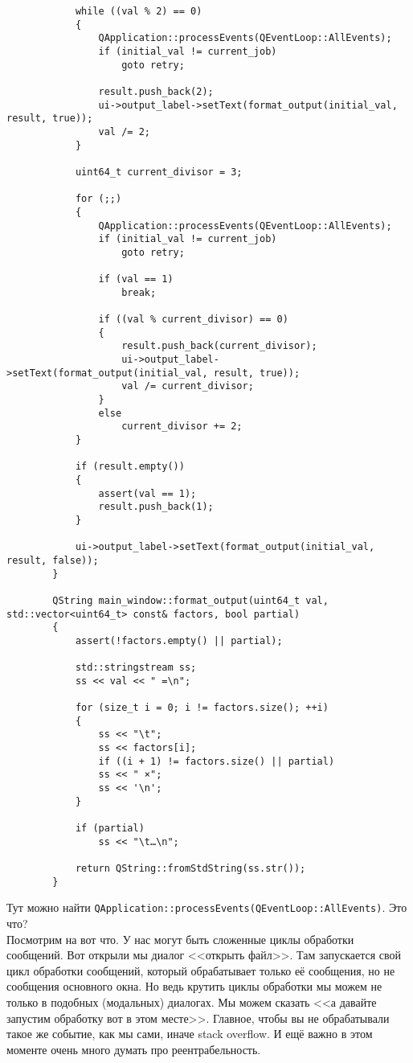 \documentclass{article}
\begin{document}
\begin{verbatim}
            while ((val % 2) == 0)
            {
                QApplication::processEvents(QEventLoop::AllEvents);
                if (initial_val != current_job)
                    goto retry;
                
                result.push_back(2);
                ui->output_label->setText(format_output(initial_val, result, true));
                val /= 2;
            }
            
            uint64_t current_divisor = 3;
            
            for (;;)
            {
                QApplication::processEvents(QEventLoop::AllEvents);
                if (initial_val != current_job)
                    goto retry;
                
                if (val == 1)
                    break;
                
                if ((val % current_divisor) == 0)
                {
                    result.push_back(current_divisor);
                    ui->output_label->setText(format_output(initial_val, result, true));
                    val /= current_divisor;
                }
                else
                    current_divisor += 2;
            }
            
            if (result.empty())
            {
                assert(val == 1);
                result.push_back(1);
            }
            
            ui->output_label->setText(format_output(initial_val, result, false));
        }
        
        QString main_window::format_output(uint64_t val, std::vector<uint64_t> const& factors, bool partial)
        {
            assert(!factors.empty() || partial);
            
            std::stringstream ss;
            ss << val << " =\n";
            
            for (size_t i = 0; i != factors.size(); ++i)
            {
                ss << "\t";
                ss << factors[i];
                if ((i + 1) != factors.size() || partial)
                ss << " ×";
                ss << '\n';
            }
            
            if (partial)
                ss << "\t…\n";
            
            return QString::fromStdString(ss.str());
        }
    \end{verbatim}
    Тут можно найти \texttt{QApplication::processEvents(QEventLoop::AllEvents)}. Это что?\\
    Посмотрим на вот что. У нас могут быть сложенные циклы обработки сообщений. Вот открыли мы диалог <<открыть файл>>. Там запускается свой цикл обработки сообщений, который обрабатывает только её сообщения, но не сообщения основного окна. Но ведь крутить циклы обработки мы можем не только в подобных (модальных) диалогах. Мы можем сказать <<а давайте запустим обработку вот в этом месте>>. Главное, чтобы вы не обрабатывали такое же событие, как мы сами, иначе stack overflow. И ещё важно в этом моменте очень много думать про реентрабельность.
\end{document}
